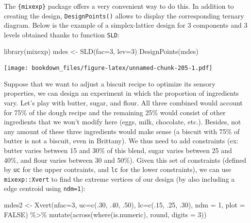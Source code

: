 \documentclass[
]{krantz}
\makeatletter
\newenvironment{Shaded}{\begin{snugshade}}{\end{snugshade}}
\newcommand{\AttributeTok}[1]{\textcolor[rgb]{0.61,0.61,0.61}{#1}}
\newcommand{\ConstantTok}[1]{\textcolor[rgb]{0,0,0}{#1}}
\newcommand{\DecValTok}[1]{\textcolor[rgb]{0.06,0.06,0.06}{#1}}
\newcommand{\FunctionTok}[1]{\textcolor[rgb]{0,0,0}{#1}}
\newcommand{\NormalTok}[1]{#1}
\newcommand{\OtherTok}[1]{\textcolor[rgb]{0.37,0.37,0.37}{#1}}
\newcommand{\SpecialCharTok}[1]{\textcolor[rgb]{0,0,0}{#1}}
\newenvironment{kframe}{%
\medskip{}
\setlength{\fboxsep}{.8em}
 \def\at@end@of@kframe{}%
 \ifinner\ifhmode%
  \def\at@end@of@kframe{\end{minipage}}%
  \begin{minipage}{\columnwidth}%
 \fi\fi%
 \def\FrameCommand##1{\hskip\@totalleftmargin \hskip-\fboxsep
 \colorbox{shadecolor}{##1}\hskip-\fboxsep
     \hskip-\linewidth \hskip-\@totalleftmargin \hskip\columnwidth}%
 \MakeFramed {\advance\hsize-\width
   \@totalleftmargin\z@ \linewidth\hsize
   \@setminipage}}%
 {\par\unskip\endMakeFramed%
 \at@end@of@kframe}
\renewenvironment{Shaded}{\begin{kframe}}{\end{kframe}}
\makeatother
\begin{document}
The \texttt{\{mixexp\}} package offers a very convenient way to do this. In addition to creating the design, \texttt{DesignPoints()} allows to display the corresponding ternary diagram. Below is the example of a simplex-lattice design for 3 components and 3 levels obtained thanks to function \texttt{SLD}:

\begin{Shaded}
\begin{Highlighting}[]
\FunctionTok{library}\NormalTok{(mixexp)}
\NormalTok{mdes }\OtherTok{\textless{}{-}} \FunctionTok{SLD}\NormalTok{(}\AttributeTok{fac=}\DecValTok{3}\NormalTok{, }\AttributeTok{lev=}\DecValTok{3}\NormalTok{)}
\FunctionTok{DesignPoints}\NormalTok{(mdes)}
\end{Highlighting}
\end{Shaded}

\texttt{[image: bookdown\_files/figure-latex/unnamed-chunk-205-1.pdf]}

Suppose that we want to adjust a biscuit recipe to optimize its sensory properties, we can design an experiment in which the proportion of ingredients vary. Let's play with butter, sugar, and flour. All three combined would account for 75\% of the dough recipe and the remaining 25\% would consist of other ingredients that we won't modify here (eggs, milk, chocolate, etc.). Besides, not any amount of these three ingredients would make sense (a biscuit with 75\% of butter is not a biscuit, even in Brittany). We thus need to add constraints (ex: butter varies between 15 and 30\% of this blend, sugar varies between 25 and 40\%, and flour varies between 30 and 50\%). Given this set of constraints (defined by \texttt{uc} for the upper contraints, and \texttt{lc} for the lower constraints), we can use \texttt{mixexp::Xvert} to find the extreme vertices of our design (by also including a edge centroid using \texttt{ndm=1}):

\begin{Shaded}
\begin{Highlighting}[]
\NormalTok{mdes2 }\OtherTok{\textless{}{-}} \FunctionTok{Xvert}\NormalTok{(}\AttributeTok{nfac=}\DecValTok{3}\NormalTok{, }\AttributeTok{uc=}\FunctionTok{c}\NormalTok{(.}\DecValTok{30}\NormalTok{, .}\DecValTok{40}\NormalTok{, .}\DecValTok{50}\NormalTok{), }\AttributeTok{lc=}\FunctionTok{c}\NormalTok{(.}\DecValTok{15}\NormalTok{, .}\DecValTok{25}\NormalTok{, .}\DecValTok{30}\NormalTok{), }
               \AttributeTok{ndm =} \DecValTok{1}\NormalTok{, }\AttributeTok{plot =} \ConstantTok{FALSE}\NormalTok{) }\SpecialCharTok{\%\textgreater{}\%} 
      \FunctionTok{mutate}\NormalTok{(}\FunctionTok{across}\NormalTok{(}\FunctionTok{where}\NormalTok{(is.numeric), round, }\AttributeTok{digits =} \DecValTok{3}\NormalTok{))}
\end{Highlighting}
\end{Shaded}
\end{document}
